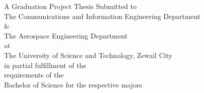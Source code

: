 \begin{titlepage}
\begin{center}
        
        \large
        \centering
        A Graduation Project Thesis Submitted to
        \\
        The Communications and Information Engineering Department\\
        \& \\
        The Aerospace Engineering Department\\
        at\\ 
        The University of Science and Technology, Zewail City \\ 
        \vspace{0.2cm}
        \large
        in partial fulfillment of the\\ requirements of the\\
        Bachelor of Science for the respective majors

        
    \end{center}
\end{titlepage}